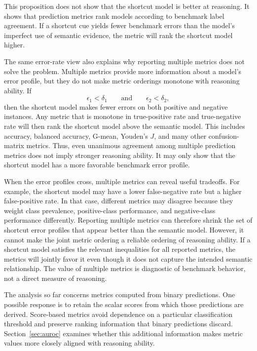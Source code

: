 \documentclass[acmsmall,screen,review,anonymous]{acmart}
\begin{document}
This proposition does not show that the shortcut model is better at
reasoning. It shows that prediction metrics rank models according to
benchmark label agreement. If a shortcut cue yields fewer benchmark errors
than the model's imperfect use of semantic evidence, the metric will rank the
shortcut model higher.

The same error-rate view also explains why reporting multiple metrics does
not solve the problem. Multiple metrics provide more information about a
model's error profile, but they do not make metric orderings monotone with
reasoning ability. If
\[
\epsilon_1<\delta_1
\qquad\text{and}\qquad
\epsilon_2<\delta_2,
\]
then the shortcut model makes fewer errors on both positive and negative
instances. Any metric that is monotone in true-positive rate and
true-negative rate will then rank the shortcut model above the semantic
model. This includes accuracy, balanced accuracy, G-mean, Youden's \(J\), and
many other confusion-matrix metrics. Thus, even unanimous agreement among
multiple prediction metrics does not imply stronger reasoning ability. It
may only show that the shortcut model has a more favorable benchmark error
profile.

When the error profiles cross, multiple metrics can reveal useful tradeoffs.
For example, the shortcut model may have a lower false-negative rate but a
higher false-positive rate. In that case, different metrics may disagree
because they weight class prevalence, positive-class performance, and
negative-class performance differently. 
%
Reporting multiple metrics can therefore shrink the set of shortcut error
profiles that appear better than the semantic model. However, it cannot make
the joint metric ordering a reliable ordering of reasoning ability. If a
shortcut model satisfies the relevant inequalities for all reported metrics,
the metrics will jointly favor it even though it does not capture the
intended semantic relationship. The value of multiple metrics is diagnostic
of benchmark behavior, not a direct measure of reasoning.
%

The analysis so far concerns metrics computed from binary predictions. One
possible response is to retain the scalar scores from which those predictions
are derived. Score-based metrics avoid dependence on a particular
classification threshold and preserve ranking information that binary
predictions discard. Section~\ref{sec:auroc} examines whether this additional
information makes metric values more closely aligned with reasoning ability.
\end{document}
